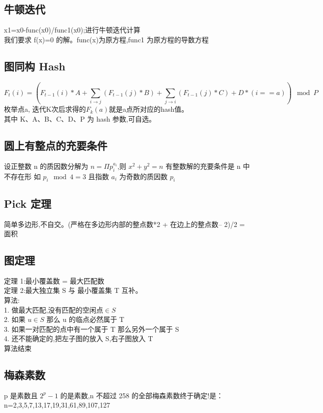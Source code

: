 \subsection*{牛顿迭代}
x1=x0-func(x0)/func1(x0);进行牛顿迭代计算\\
我们要求 f(x)=0 的解。func(x)为原方程,func1 为原方程的导数方程
\subsection*{图同构 Hash}
	\begin{displaymath}
		F_t(i) = (F_{t - 1}(i) * A + \sum_{i \to j} (F_{t - 1}(j) * B) + \sum_{j \to i} (F_{t - 1}(j) * C) + D * (i == a)) \mod P
	\end{displaymath}
	枚举点a, 迭代K次后求得的$F_k(a)$就是a点所对应的hash值。\\
	其中 K、A、B、C、D、P 为 hash 参数,可自选。

\subsection*{圆上有整点的充要条件}
设正整数 n 的质因数分解为 $n = \Pi p_i^{a_i}$,则 $x^2+y^2=n$ 有整数解的充要条件是 n 中不存在形
如 $p_i \mod 4 = 3$ 且指数 $a_i$ 为奇数的质因数 $p_i$

\subsection*{Pick 定理}
	简单多边形,不自交。(严格在多边形内部的整点数*2 + 在边上的整点数– 2)/2 = 面积

\subsection*{图定理}
	定理 1:最小覆盖数 = 最大匹配数\\
	定理 2:最大独立集 S 与 最小覆盖集 T 互补。\\
	算法:\\
	1. 做最大匹配,没有匹配的空闲点$\in S$\\
	2. 如果 $u \in S$ 那么 u 的临点必然属于 T\\
	3. 如果一对匹配的点中有一个属于 T 那么另外一个属于 S\\
	4. 还不能确定的,把左子图的放入 S,右子图放入 T\\
	算法结束\\

\subsection*{梅森素数}
	p 是素数且 $2^p-1$ 的是素数,n 不超过 258 的全部梅森素数终于确定!是：\\
	n=2,3,5,7,13,17,19,31,61,89,107,127

